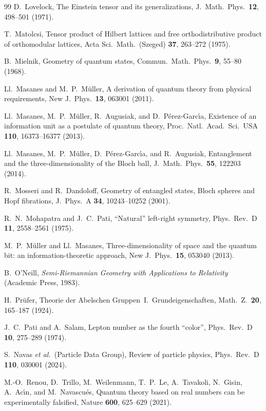 \documentclass[aps,pra,onecolumn,superscriptaddress,nofootinbib,10pt]{revtex4-2}
\theoremstyle{definition}
\theoremstyle{remark}
\begin{document}
\begin{thebibliography}{99}
 D.~Lovelock, The Einstein tensor and its generalizations, J.\ Math.\ Phys.\ \textbf{12}, 498--501 (1971).

 T.~Matolcsi, Tensor product of Hilbert lattices and free orthodistributive product of orthomodular lattices, Acta Sci.\ Math.\ (Szeged) \textbf{37}, 263--272 (1975).

 B.~Mielnik, Geometry of quantum states, Commun.\ Math.\ Phys.\ \textbf{9}, 55--80 (1968).

 Ll.~Masanes and M.~P.~M\"uller, A derivation of quantum theory from physical requirements, New J.\ Phys.\ \textbf{13}, 063001 (2011).

 Ll.~Masanes, M.~P.~M\"uller, R.~Augusiak, and D.~P\'erez-Garc\'{\i}a, Existence of an information unit as a postulate of quantum theory, Proc.\ Natl.\ Acad.\ Sci.\ USA \textbf{110}, 16373--16377 (2013).

 Ll.~Masanes, M.~P.~M\"uller, D.~P\'erez-Garc\'{\i}a, and R.~Augusiak, Entanglement and the three-dimensionality of the Bloch ball, J.\ Math.\ Phys.\ \textbf{55}, 122203 (2014).

 R.~Mosseri and R.~Dandoloff, Geometry of entangled states, Bloch spheres and Hopf fibrations, J.\ Phys.\ A \textbf{34}, 10243--10252 (2001).

 R.~N.~Mohapatra and J.~C.~Pati, ``Natural'' left-right symmetry, Phys.\ Rev.\ D \textbf{11}, 2558--2561 (1975).

 M.~P.~M\"uller and Ll.~Masanes, Three-dimensionality of space and the quantum bit: an information-theoretic approach, New J.\ Phys.\ \textbf{15}, 053040 (2013).

 B.~O'Neill, \emph{Semi-Riemannian Geometry with Applications to Relativity} (Academic Press, 1983).

 H.~Pr\"ufer, Theorie der Abelschen Gruppen~I.\ Grundeigenschaften, Math.\ Z.\ \textbf{20}, 165--187 (1924).

 J.~C.~Pati and A.~Salam, Lepton number as the fourth ``color'', Phys.\ Rev.\ D \textbf{10}, 275--289 (1974).

 S.~Navas \emph{et al.}\ (Particle Data Group), Review of particle physics, Phys.\ Rev.\ D \textbf{110}, 030001 (2024).

 M.-O.~Renou, D.~Trillo, M.~Weilenmann, T.~P.~Le, A.~Tavakoli, N.~Gisin, A.~Ac\'{\i}n, and M.~Navascu\'es, Quantum theory based on real numbers can be experimentally falsified, Nature \textbf{600}, 625--629 (2021).


\end{thebibliography}
\end{document}
